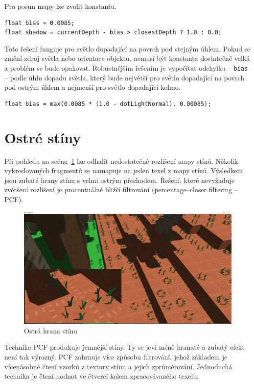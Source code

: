 \documentclass[thesis=M,czech]{FITthesis}[2019/12/23]
\begin{document}
Pro posun mapy lze zvolit konstantu.

\begin{verbatim}
float bias = 0.0085;
float shadow = currentDepth - bias > closestDepth ? 1.0 : 0.0;
\end{verbatim}

Toto řešení funguje pro světlo dopadající na povrch pod stejným úhlem. Pokud se změní zdroj světla nebo orientace objektu, nemusí být konstanta dostatečně velká a problém se bude opakovat. Robustnějším řešením je vypočítat odchylku -- \texttt{bias} -- podle úhlu dopadu světla, který bude největší pro světlo dopadající na povrch pod ostrým úhlem a nejmenší pro světlo dopadající kolmo.

\begin{verbatim}
float bias = max(0.0085 * (1.0 - dotLightNormal), 0.00085);
\end{verbatim}

\section{Ostré stíny}

Při pohledu na scénu~\ref{fig:shadows_pcf_hard} lze odhalit nedostatečné rozlišení mapy stínů. Několik vykreslovaných fragmentů se namapuje na jeden texel z mapy stínů. Výsledkem jsou zubaté hrany stínu s velmi ostrým přechodem. Řešení, které nevyžaduje zvětšení rozlišení je procentuálně bližší filtrování (percentage--closer filtering -- PCF).

\begin{figure}\centering
	\includegraphics[width=\textwidth]{images/shadows/pcf_hard}
	\caption[Ostrá hrana stínu]{Ostrá hrana stínu}\label{fig:shadows_pcf_hard}
\end{figure}

Technika PCF produkuje jemnější stíny. Ty se jeví méně hranaté a zubatý efekt není tak výrazný. PCF zahrnuje více způsobu filtrování, jehož základem je vícenásobné čtení vzorků z textury stínu a jejich zprůměrování. Jednoduchá technika je čtení hodnot ve čtverci kolem zpracovávaného texelu.
\end{document}
